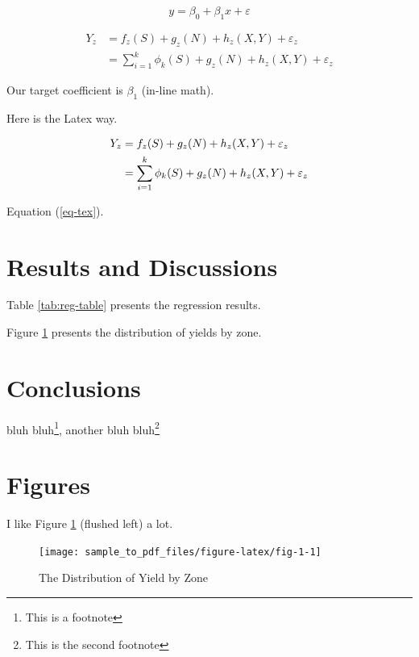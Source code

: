 \documentclass[
]{article}
\begin{document}
\begin{equation}
y = \beta_0 + \beta_1 x + \varepsilon
\label{eq:eqn1}
\end{equation}

\begin{align}
Y_z & = f_z(S) + g_z(N) + h_z(X,Y) + \varepsilon_z \\
& = \sum_{i=1}^k \phi_k(S) + g_z(N) + h_z(X,Y) + \varepsilon_z \label{eq:eqn2}
\end{align}

Our target coefficient is \(\beta_1\) (in-line math).

Here is the Latex way.

\begin{align}
Y_z & = f_z(S) + g_z(N) + h_z(X,Y) + \varepsilon_z \notag \\
& = \sum_{i=1}^k \phi_k(S) + g_z(N) + h_z(X,Y) + \varepsilon_z \label{eq-tex}
\end{align}

Equation (\ref{eq-tex}).

\hypertarget{results-and-discussions}{%
\section{Results and Discussions}\label{results-and-discussions}}

Table \ref{tab:reg-table} presents the regression results.

Figure \ref{fig:fig-1} presents the distribution of yields by zone.

\hypertarget{conclusions}{%
\section{Conclusions}\label{conclusions}}

bluh bluh\footnote{This is a footnote}, another bluh bluh\footnote{This is the second footnote}

\newpage

\hypertarget{figures}{%
\section*{Figures}\label{figures}}

I like Figure \ref{fig:fig-1} (flushed left) a lot.

\begin{figure}

\texttt{[image: sample\_to\_pdf\_files/figure-latex/fig-1-1]} \hfill{}

\caption{The Distribution of Yield by Zone}\label{fig:fig-1}
\end{figure}
\end{document}
